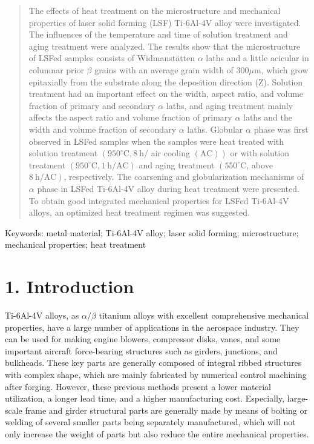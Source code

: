 \documentclass[10pt]{article}
\begin{document}
\begin{abstract}
The effects of heat treatment on the microstructure and mechanical properties of laser solid forming (LSF) Ti-6Al-4V alloy were investigated. The influences of the temperature and time of solution treatment and aging treatment were analyzed. The results show that the microstructure of LSFed samples consists of Widmanstätten $\alpha$ laths and a little acicular in columnar prior $\beta$ grains with an average grain width of $300 \mu \mathrm{m}$, which grow epitaxially from the substrate along the deposition direction (Z). Solution treatment had an important effect on the width, aspect ratio, and volume fraction of primary and secondary $\alpha$ laths, and aging treatment mainly affects the aspect ratio and volume fraction of primary $\alpha$ laths and the width and volume fraction of secondary $\alpha$ laths. Globular $\alpha$ phase was first observed in LSFed samples when the samples were heat treated with solution treatment $\left(950^{\circ} \mathrm{C}, 8 \mathrm{~h} /\right.$ air cooling $\left.(\mathrm{AC})\right)$ or with solution treatment $\left(950^{\circ} \mathrm{C}, 1 \mathrm{~h} / \mathrm{AC}\right)$ and aging treatment $\left(550^{\circ} \mathrm{C}\right.$, above $\left.8 \mathrm{~h} / \mathrm{AC}\right)$, respectively. The coarsening and globularization mechanisms of $\alpha$ phase in LSFed Ti-6Al-4V alloy during heat treatment were presented. To obtain good integrated mechanical properties for LSFed Ti-6Al-4V alloys, an optimized heat treatment regimen was suggested.
\end{abstract}

Keywords: metal material; Ti-6Al-4V alloy; laser solid forming; microstructure; mechanical properties; heat treatment

\section*{1. Introduction}
Ti-6Al-4V alloys, as $\alpha / \beta$ titanium alloys with excellent comprehensive mechanical properties, have a large number of applications in the aerospace industry. They can be used for making engine blowers, compressor disks, vanes, and some important aircraft force-bearing structures such as girders, junctions, and bulkheads. These key parts are generally composed of integral ribbed structures with complex shape, which are mainly fabricated by numerical control machining after forging. However, these previous methods present a lower material utilization, a longer lead time, and a higher manufacturing cost. Especially, large-scale frame and girder structural parts are generally made by means of bolting or welding of several smaller parts being separately manufactured, which will not only increase the weight of parts but also reduce the entire mechanical properties.
\end{document}
